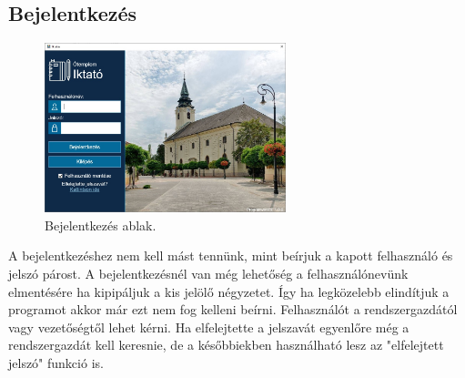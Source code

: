 \documentclass[
]{thesis-ekf}
\theoremstyle{definition}
\theoremstyle{remark}
\begin{document}
\subsection{Bejelentkezés}
\begin{figure}[!ht]
	\centering
	\includegraphics[width=7cm]{dokukepek/clogin}
	\caption{Bejelentkezés ablak.}
	\label{fig:clogin2}
\end{figure}
A bejelentkezéshez nem kell mást tennünk, mint beírjuk a kapott felhasználó és jelszó párost. A bejelentkezésnél van még lehetőség a felhasználónevünk elmentésére ha kipipáljuk a kis jelölő négyzetet. Így ha legközelebb elindítjuk a programot akkor már ezt nem fog kelleni beírni. Felhasználót a rendszergazdától vagy vezetőségtől lehet kérni. Ha elfelejtette a jelszavát egyenlőre még a rendszergazdát kell keresnie, de a későbbiekben használható lesz az "elfelejtett jelszó" funkció is.
\end{document}
